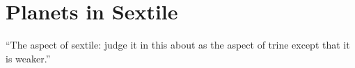 \section{Planets in Sextile}
``The aspect of sextile: judge it in this about as the aspect of trine except that it is weaker.''